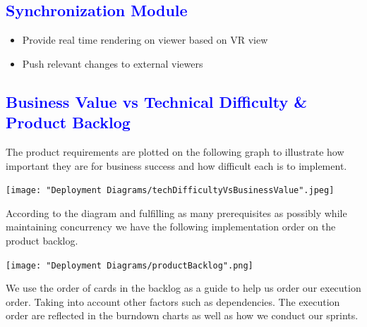 \documentclass[12pt]{article}
\begin{document}
\begin{flushleft}
	\textcolor{blue}{\subsection{Synchronization Module}}	
	\begin{flushleft}
	\begin{itemize}
	\item Provide real time rendering on viewer based on VR view
	\item Push relevant changes to external viewers
	\end{itemize}	
	\end{flushleft}

\end{flushleft}

\textcolor{blue}{\section{Business Value vs Technical Difficulty \& Product Backlog}}
\begin{flushleft}
 	
 	The product requirements are plotted on the following graph to illustrate how important they are for business success and how difficult each is to implement.
	
	\texttt{[image: "Deployment Diagrams/techDifficultyVsBusinessValue".jpeg]}
	
	According to the diagram and fulfilling as many prerequisites as possibly while maintaining concurrency we have the following implementation order on the product backlog.
	
	\texttt{[image: "Deployment Diagrams/productBacklog".png]}

\end{flushleft}

\begin{flushleft}

	We use the order of cards in the backlog as a guide to help us order our execution order. Taking into account other factors such as dependencies. The execution order are reflected in the burndown charts as well as how we conduct our sprints.
	
\end{flushleft}
\end{document}
